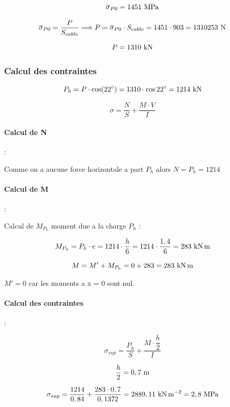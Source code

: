 \documentclass[12pt,a4paper]{article}
\newcommand{\sgma}[1]{\sigma_{#1}}
\newcommand{\sigmabar}[1]{\overline{\sigma}_{#1}}
\begin{document}
	\[ \sigmabar{P0} = 1451\mpa \]
	
	\[ \sigmabar{P0} = \dfrac{P}{S_{cable}} \Longrightarrow P = \sigmabar{P0} \cdot S_{cable} = 1451 \cdot 903 = 1310253\N \]
	
	\[ P = 1310\kn \]

	\subsubsection{Calcul des contraintes}
	
	\[ P_{h} = P \cdot \cos(22\degree) = 1310 \cdot \cos22\degree = 1214\kn \]
	
	\[ \sigma = \dfrac{N}{S} + \dfrac{M \cdot V}{I} \]
	
	\paragraph{Calcul de N} :
	
	\vspace{\baselineskip}
	
	Comme on a aucune force horizontale a part $P_{h}$ alors $N = P_{h} = 1214$
	 
	\paragraph{Calcul de M} :
	
	Calcul de $M_{P_{h}}$ moment due a la charge $P_{h}$ : 
	
	\[ M_{P_{h}} = P_{h} \cdot e = 1214 \cdot \dfrac{h}{6} = 1214 \cdot \dfrac{1,4}{6} = 283\knxm \]
	
	\vspace{\baselineskip}
	
	\[ M = M' + M_{P_{h}} = 0 + 283 = 283\knxm \]

	$M' = 0$ car les moments a x = 0 sont nul.
	
	\vspace{\baselineskip}
	
	\paragraph{Calcul des contraintes} :
	
	\[ \sgma{sup} = \dfrac{P_{h}}{S} + \dfrac{M \cdot \dfrac{h}{2}}{I} \]

	\[ \dfrac{h}{2} = 0,7\meterl \]

	\[ \sgma{sup} = \dfrac{1214}{0,84} + \dfrac{283 \cdot 0,7}{0,1372} = 2889,11\knms = 2,8\mpa \]
	
\end{document}
